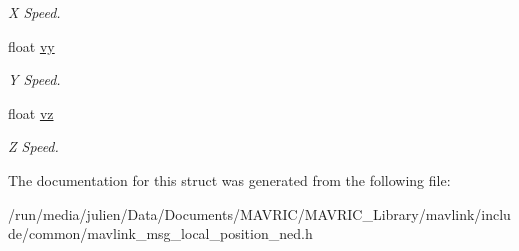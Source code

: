 \begin{DoxyCompactItemize}
\begin{DoxyCompactList}\small\item\em X Speed. \end{DoxyCompactList}\item 
\hypertarget{struct____mavlink__local__position__ned__t_a0e9a5142819014e5807a657409608fa6}{float \hyperlink{struct____mavlink__local__position__ned__t_a0e9a5142819014e5807a657409608fa6}{vy}}\label{struct____mavlink__local__position__ned__t_a0e9a5142819014e5807a657409608fa6}

\begin{DoxyCompactList}\small\item\em Y Speed. \end{DoxyCompactList}\item 
\hypertarget{struct____mavlink__local__position__ned__t_aa34bbb949b0afd4bd524f455b9d980f6}{float \hyperlink{struct____mavlink__local__position__ned__t_aa34bbb949b0afd4bd524f455b9d980f6}{vz}}\label{struct____mavlink__local__position__ned__t_aa34bbb949b0afd4bd524f455b9d980f6}

\begin{DoxyCompactList}\small\item\em Z Speed. \end{DoxyCompactList}\end{DoxyCompactItemize}


The documentation for this struct was generated from the following file\+:\begin{DoxyCompactItemize}
\item 
/run/media/julien/\+Data/\+Documents/\+M\+A\+V\+R\+I\+C/\+M\+A\+V\+R\+I\+C\+\_\+\+Library/mavlink/include/common/mavlink\+\_\+msg\+\_\+local\+\_\+position\+\_\+ned.\+h\end{DoxyCompactItemize}
